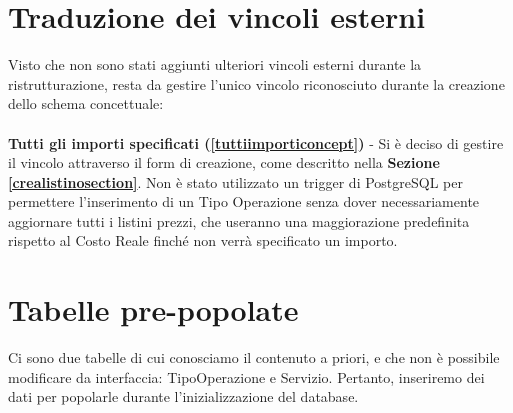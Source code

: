 \section{Traduzione dei vincoli esterni}
Visto che non sono stati aggiunti ulteriori vincoli esterni durante la ristrutturazione, resta da gestire l'unico vincolo riconosciuto durante la creazione
dello schema concettuale:
\\\\
\textbf{\label{tuttiimportitraduzione}Tutti gli importi specificati (\ref{tuttiimporticoncept})} - Si \`e deciso di gestire il vincolo attraverso il form di creazione, come descritto
nella \textbf{Sezione \ref{crealistinosection}}. Non \`e stato utilizzato un trigger di PostgreSQL per permettere l'inserimento di un Tipo Operazione senza dover necessariamente
aggiornare tutti i listini prezzi, che useranno una maggiorazione predefinita rispetto al Costo Reale finch\'e non verr\`a specificato un importo.

\section {Tabelle pre-popolate}
Ci sono due tabelle di cui conosciamo il contenuto a priori, e che non \`e possibile modificare da interfaccia: TipoOperazione e Servizio. Pertanto, inseriremo dei dati per popolarle
durante l'inizializzazione del database.
